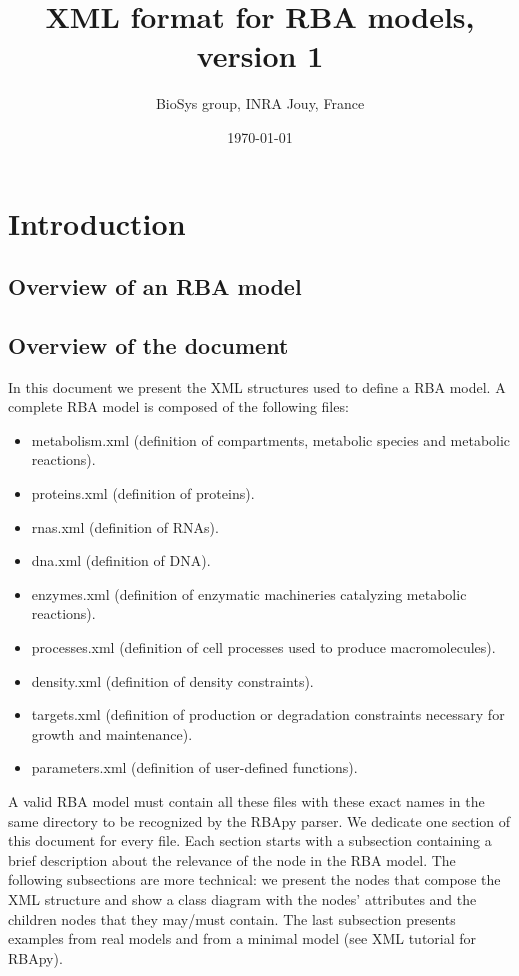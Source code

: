 \documentclass[12pt]{scrartcl}
\begin{document}
\title{XML format for RBA models, version 1}
\author{BioSys group, INRA Jouy, France}
\date{\today}

\maketitle

\newpage

\tableofcontents

\newpage

\section{Introduction}

\subsection{Overview of an RBA model}



\subsection{Overview of the document}

In this document we present the XML structures used to define a RBA model.
A complete RBA model is composed of the following files:
\begin{itemize}
  \item metabolism.xml
  (definition of compartments, metabolic species and metabolic reactions).
  \item proteins.xml (definition of proteins).
  \item rnas.xml (definition of RNAs).
  \item dna.xml (definition of DNA).
  \item enzymes.xml
  (definition of enzymatic machineries catalyzing metabolic reactions).
  \item processes.xml
  (definition of cell processes used to produce macromolecules).
  \item density.xml (definition of density constraints).
  \item targets.xml
  (definition of production or degradation constraints necessary for growth and maintenance).
  \item parameters.xml
  (definition of user-defined functions).
\end{itemize}

A valid RBA model must contain all these files with these exact names in
the same directory to be recognized by the RBApy parser.
We dedicate one section of this document for every file.
Each section starts with a subsection containing a brief description
about the relevance of the node in the RBA model.
The following subsections are more technical:
we present the nodes that compose the XML structure
and show a class diagram with the nodes' attributes
and the children nodes that they may/must contain.
The last subsection presents examples from real models and from a minimal
model (see XML tutorial for RBApy).
\end{document}

